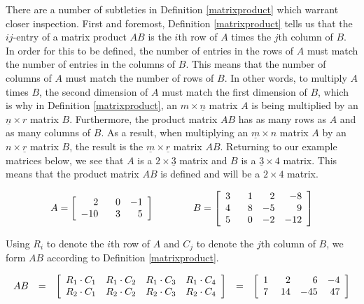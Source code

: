 There are a number of subtleties in Definition \ref{matrixproduct} which warrant closer inspection. First and foremost, Definition \ref{matrixproduct} tells us that the $ij$-entry of a matrix product $AB$ is the $i$th row of $A$ times the $j$th column of $B$.  In order for this to be defined, the number of entries in the rows of $A$ must match the number of entries in the columns of $B$. This means that the number of columns of $A$ must match the number of rows of $B$.  In other words, to multiply $A$ times $B$, the second dimension of $A$ must match the first dimension of $B$, which is why in Definition \ref{matrixproduct}, an $m \times \underline{n}$ matrix $A$ is being multiplied by an $\underline{n} \times r$ matrix $B$.  Furthermore, the product matrix $AB$ has as many rows as $A$ and as many columns of $B$. As a result, when multiplying an $\underline{m} \times n$ matrix $A$ by an $n \times \underline{r}$ matrix $B$, the result is the $\underline{m} \times \underline{r}$ matrix $AB$. Returning to our example matrices below, we see that $A$ is a $2 \times \underline{3}$ matrix and $B$ is a $\underline{3} \times 4$ matrix.  This means that the product matrix $AB$ is defined and will be a $2 \times 4$ matrix.

\[A = \left[\begin{array}{rrr} 2 & \hphantom{-}0 & -1 \\ -10 & 3 & 5 \\ \end{array} \right] \qquad  \qquad
B = \left[\begin{array}{rrrr} 3 & \hphantom{-}1 & 2 & -8 \\ 4 & 8 & -5 & 9  \\ 5 & 0 & -2 & -12 \\  \end{array} \right]
\]


Using $R_i$ to denote the $i$th row of $A$ and $C_j$ to denote the $j$th column of $B$, we form $AB$ according to Definition \ref{matrixproduct}.

\[ \begin{array}{rclcl}

AB & = & \left[\begin{array}{rrrr} R_1 \cdot C_1 &   R_1 \cdot C_2 & R_1 \cdot C_3 & R_1 \cdot C_4 \\ R_2 \cdot C_1 &   R_2 \cdot C_2 & R_2 \cdot C_3 & R_2 \cdot C_4 \\  \end{array} \right] & = & \left[\begin{array}{rrrr} 1 &  \hphantom{-}2 & 6 & -4 \\ 7 &  14 & -45 & 47 \\  \end{array} \right] \\ \end{array} \]

